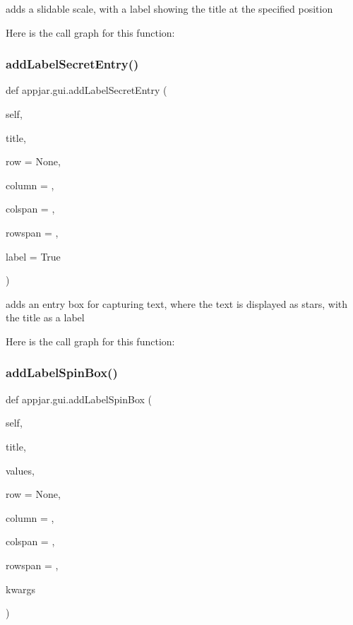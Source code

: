\begin{DoxyVerb}adds a slidable scale, with a label showing the title  at the specified position \end{DoxyVerb}
 Here is the call graph for this function\+:
\mbox{\label{classappjar_1_1gui_a3ad3ebbddda51b6115b2adae642980ce}} 
\subsubsection{\texorpdfstring{add\+Label\+Secret\+Entry()}{addLabelSecretEntry()}}
{\footnotesize\ttfamily def appjar.\+gui.\+add\+Label\+Secret\+Entry (\begin{DoxyParamCaption}\item[{}]{self,  }\item[{}]{title,  }\item[{}]{row = {\ttfamily None},  }\item[{}]{column = {},  }\item[{}]{colspan = {},  }\item[{}]{rowspan = {},  }\item[{}]{label = {\ttfamily True} }\end{DoxyParamCaption})}

\begin{DoxyVerb}adds an entry box for capturing text, where the text is displayed as stars, with the title as a label \end{DoxyVerb}
 Here is the call graph for this function\+:
\mbox{\label{classappjar_1_1gui_a4c665fc9921dff98bdabeff571edc32f}} 
\subsubsection{\texorpdfstring{add\+Label\+Spin\+Box()}{addLabelSpinBox()}}
{\footnotesize\ttfamily def appjar.\+gui.\+add\+Label\+Spin\+Box (\begin{DoxyParamCaption}\item[{}]{self,  }\item[{}]{title,  }\item[{}]{values,  }\item[{}]{row = {\ttfamily None},  }\item[{}]{column = {},  }\item[{}]{colspan = {},  }\item[{}]{rowspan = {},  }\item[{}]{kwargs }\end{DoxyParamCaption})}

